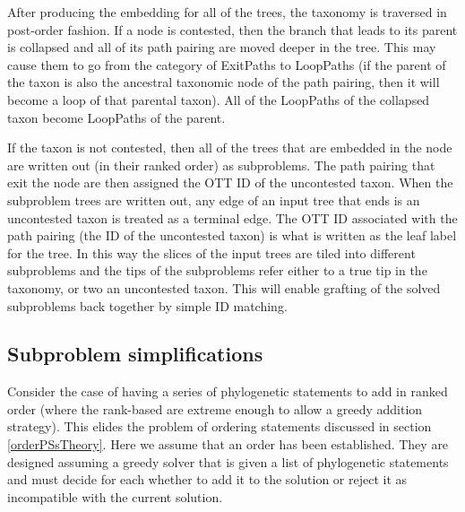 \documentclass[11pt]{article}
\newcommand{\pss}{phylogenetic statements\xspace}
\begin{document}
After producing the embedding for all of the trees, the taxonomy is traversed in post-order
    fashion.
If a node is contested, then the branch that leads to its parent is collapsed and
    all of its path pairing are moved deeper in the tree.
This may cause them to go from the category of ExitPaths to LoopPaths (if the parent of the
    taxon is also the ancestral taxonomic node of the path pairing, then it will become
    a loop of that parental taxon).
All of the LoopPaths of the collapsed taxon become LoopPaths of the parent.

If the taxon is not contested, then all of the trees that are embedded in the node
    are written out (in their ranked order) as subproblems.
The path pairing that exit the node are then assigned the OTT ID of the uncontested taxon.
When the subproblem trees are written out, any edge of an input tree that ends is an uncontested
    taxon is treated as a terminal edge.
The OTT ID associated with the path pairing (the ID of the uncontested taxon) is what is
    written as the leaf label for the tree.
In this way the slices of the input trees are tiled into different subproblems and the tips
    of the subproblems refer either to a true tip in the taxonomy, or two an uncontested taxon.
This will enable grafting of the solved subproblems back together by simple ID matching.

\subsection{Subproblem simplifications}\label{simplificationTheory}
Consider the case of having a series of \pss to add in ranked order (where the
    rank-based are extreme enough to allow a greedy addition strategy).
This elides the problem of ordering statements discussed in section \ref{orderPSsTheory}. 
Here we assume that an order has been established.
They are designed assuming a greedy solver that is given a list of \pss and must decide
    for each whether to add it to the solution or reject it as incompatible with the 
    current solution.
\end{document}
